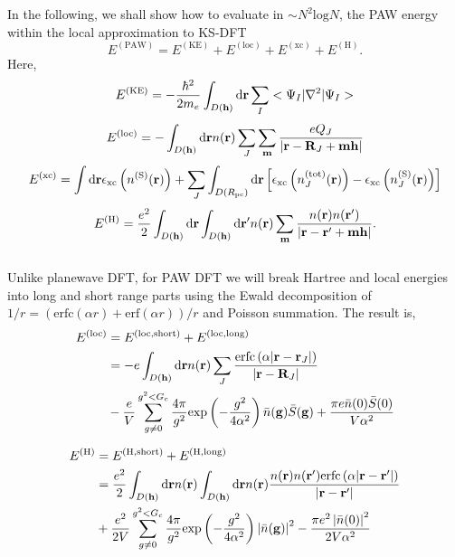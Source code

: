 \documentclass[paper=a4, fontsize=11pt]{article} %
\numberwithin{equation}{section} %
\numberwithin{figure}{section} %
\numberwithin{table}{section} %
\newcommand{\bh}{{\bf{h}}}
\newcommand{\bm}{{\bf{m}}}
\newcommand{\bg}{{\bf{g}}}
\newcommand{\br}{{\bf{r}}}
\newcommand{\bR}{{\bf{R}}}
\newcommand{\rexp}{{\mathrm{exp}}}
\newcommand{\rS}{{\mathrm{S}}}
\newcommand{\rKE}{{\mathrm{KE}}}
\newcommand{\rxc}{{\mathrm{xc}}}
\newcommand{\rshort}{{\mathrm{short}}}
\newcommand{\rlong}{{\mathrm{long}}}
\newcommand{\rerf}{{\mathrm{erf}}}
\newcommand{\rerfc}{{\mathrm{erfc}}}
\newcommand{\rP}{{\mathrm{PAW}}}
\newcommand{\rd}{{\mathrm{d}}}
\newcommand{\rH}{{\mathrm{H}}}
\newcommand{\rlo}{{\mathrm{loc}}}
\newcommand{\rl}{{\mathrm{log}}}
\newcommand{\rtot}{{\mathrm{tot}}}
\newcommand{\al}{{\alpha}}
\newcommand{\Rpc}{{R_{\mathrm{pc}}}}
\begin{document}
In the following, we shall show how to evaluate in $\sim N^2 \rl N$, the PAW energy within the local approximation to KS-DFT
\begin{equation}
E^{(\rP)} = E^{(\rKE)} +  E^{(\rlo)} + E^{(\rxc)} + E^{(\rH)}.
\end{equation}
Here,
\begin{equation}
E^{(\rKE)} = -\frac{\hbar^2}{2m_e}\int_{D(\bh)} \rd \br \sum_{I}<\Psi_I|\nabla^2|\Psi_I>
\end{equation}
\begin{equation}
E^{(\rlo)} = -\int_{D(\bh)} \rd \br n(\br) \sum_J \sum_{\bm}\frac{eQ_J}{\left|\br-\bR_J + \bm\bh\right|}
\end{equation}
\begin{equation}
E^{(\rxc)} = \int \rd\br \epsilon_{\rxc}\left(n^{(\rS)}(\br)\right) + \sum_J \int_{D(\Rpc)} \rd \br \left[\epsilon_{\rxc}
\left(n_J^{(\rtot)}(\br)\right)-\epsilon_{\rxc}\left(n_J^{(\rS)}(\br)\right)\right]
\end{equation}
\begin{equation}
E^{(\rH)} = \frac{e^2}{2}\int_{D(\bh)} \rd \br \int_{D(\bh)} \rd \br' n(\br) \sum_{\bm}\frac{n(\br)n(\br')}{\left|\br-\br' + \bm\bh\right|}.
\end{equation}
\\

Unlike planewave DFT, for PAW DFT we will break Hartree and local energies into long and short range parts using the Ewald decomposition of $1/r = (\rerfc(\alpha r) + \rerf(\alpha r))/r$ and Poisson summation. The result is, 
\\
\begin{equation}
\begin{split}
E^{(\rlo)}
&= E^{(\rlo,\rshort)}+E^{(\rlo,\rlong)} \\
&= -e\int_{D(\bh)} \rd \br n(\br) \sum_J \frac{\rerfc\left(\alpha|\br-\br_J|\right)}{\left|\br-\bR_J\right|} \\
&- \frac{e}{V}\sum_{g \neq 0} ^{g^2 < G_c}\frac{4\pi}{g^2}\rexp\left(-\frac{g^2}{4\al^2}\right)\bar n(\bg) \bar S(\bg) + \frac{\pi e \bar n(0) \bar S(0)}{V\al^2}
\end{split}
\end{equation}

\begin{equation}
\begin{split}
E^{(\rH)}
&= E^{(\rH,\rshort)}+E^{(\rH,\rlong)} \\
&= \frac{e^2}{2}\int_{D(\bh)} \rd \br n(\br) \int_{D(\bh)} \rd \br n(\br) \frac{n(\br)n(\br')\rerfc\left(\al|\br-\br'|\right)}{\left|\br-\br'\right|} \\
&+ \frac{e^2}{2V}\sum_{g \neq 0} ^{g^2 < G_c}\frac{4\pi}{g^2}\rexp\left(-\frac{g^2}{4\al^2}\right)\left|\bar n(\bg)\right|^2  - \frac{\pi e^2 \left|\bar n(0)\right|^2 }{2V\al^2}
\end{split}
\end{equation}
\end{document}
